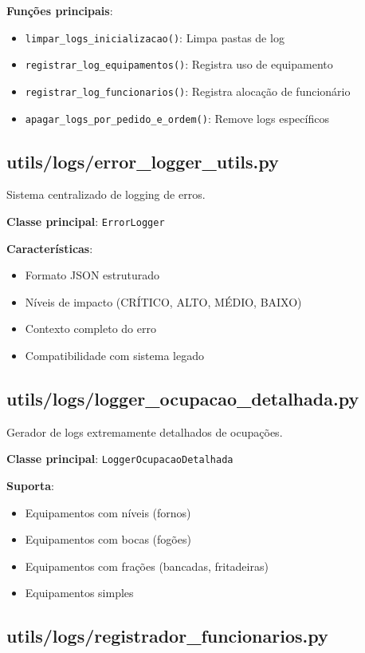 \documentclass[11pt,a4paper]{article}
\begin{document}
\textbf{Funções principais}:
\begin{itemize}[leftmargin=2cm]
    \item \texttt{limpar\_logs\_inicializacao()}: Limpa pastas de log
    \item \texttt{registrar\_log\_equipamentos()}: Registra uso de equipamento
    \item \texttt{registrar\_log\_funcionarios()}: Registra alocação de funcionário
    \item \texttt{apagar\_logs\_por\_pedido\_e\_ordem()}: Remove logs específicos
\end{itemize}

\subsection{utils/logs/error\_logger\_utils.py}

Sistema centralizado de logging de erros.

\textbf{Classe principal}: \texttt{ErrorLogger}

\textbf{Características}:
\begin{itemize}
    \item Formato JSON estruturado
    \item Níveis de impacto (CRÍTICO, ALTO, MÉDIO, BAIXO)
    \item Contexto completo do erro
    \item Compatibilidade com sistema legado
\end{itemize}

\subsection{utils/logs/logger\_ocupacao\_detalhada.py}

Gerador de logs extremamente detalhados de ocupações.

\textbf{Classe principal}: \texttt{LoggerOcupacaoDetalhada}

\textbf{Suporta}:
\begin{itemize}
    \item Equipamentos com níveis (fornos)
    \item Equipamentos com bocas (fogões)
    \item Equipamentos com frações (bancadas, fritadeiras)
    \item Equipamentos simples
\end{itemize}

\subsection{utils/logs/registrador\_funcionarios.py}
\end{document}
